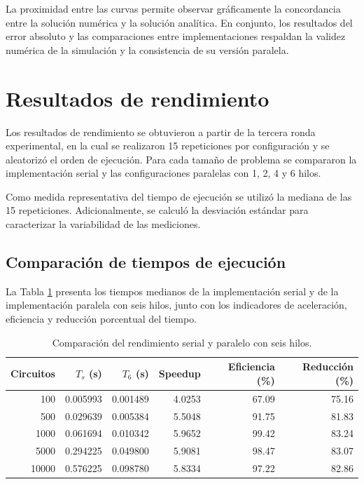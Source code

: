 \documentclass[11pt,a4paper]{article}
\begin{document}
La proximidad entre las curvas permite observar gráficamente la concordancia entre la solución numérica y la solución analítica. En conjunto, los resultados del error absoluto y las comparaciones entre implementaciones respaldan la validez numérica de la simulación y la consistencia de su versión paralela.



\section{Resultados de rendimiento}

Los resultados de rendimiento se obtuvieron a partir de la tercera ronda experimental, en la cual se realizaron 15 repeticiones por configuración y se aleatorizó el orden de ejecución. Para cada tamaño de problema se compararon la implementación serial y las configuraciones paralelas con 1, 2, 4 y 6 hilos.

Como medida representativa del tiempo de ejecución se utilizó la mediana de las 15 repeticiones. Adicionalmente, se calculó la desviación estándar para caracterizar la variabilidad de las mediciones.

\subsection{Comparación de tiempos de ejecución}

La Tabla \ref{tab:resultados6} presenta los tiempos medianos de la implementación serial y de la implementación paralela con seis hilos, junto con los indicadores de aceleración, eficiencia y reducción porcentual del tiempo.

\begin{table}[H]
\centering
\caption{Comparación del rendimiento serial y paralelo con seis hilos.}
\label{tab:resultados6}
\small
\begin{tabular}{rrrrrr}
\toprule
Circuitos & $T_s$ (s) & $T_6$ (s) & Speedup & Eficiencia (\%) & Reducción (\%)\\
\midrule
100   & 0.005993 & 0.001489 & 4.0253 & 67.09 & 75.16\\
500   & 0.029639 & 0.005384 & 5.5048 & 91.75 & 81.83\\
1000  & 0.061694 & 0.010342 & 5.9652 & 99.42 & 83.24\\
5000  & 0.294225 & 0.049800 & 5.9081 & 98.47 & 83.07\\
10000 & 0.576225 & 0.098780 & 5.8334 & 97.22 & 82.86\\
\bottomrule
\end{tabular}
\end{table}
\end{document}
